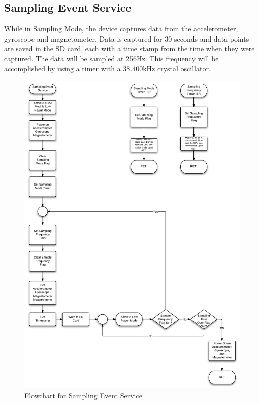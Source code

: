 \subsection{Sampling Event Service}
While in Sampling Mode, the device captures data from the accelerometer, gyroscope and magnetometer. Data is captured for 30 seconds and data points are saved in the SD card, each with a time stamp from the time when they were captured. The data will be sampled at 256Hz. This frequency will be accomplished by using a timer with a 38.400kHz crystal oscillator.
\begin{figure}[H]
	\centering
	\includegraphics[width=\textwidth]{img/SamplingEventService}
	\caption{Flowchart for Sampling Event Service \label{fig:samplingMode}}
\end{figure}

